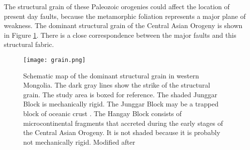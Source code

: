 The structural grain of these Paleozoic orogenies could affect the location of present day faults, because the metamorphic foliation represents a major plane of weakness. The dominant structural grain of the Central Asian Orogeny is shown in Figure \ref{grain}. There is a close correspondence between the major faults and this structural fabric. 

\begin{figure}[h!]
  \centering
  \texttt{[image: grain.png]}
  \caption{Schematic map of the dominant structural grain in western Mongolia. The dark gray lines show the strike of the structural grain. The study area is boxed for reference. The shaded Junggar Block is mechanically rigid. The Junggar Block may be a trapped block of oceanic crust \citep{Carroll1990a}.  The Hangay Block consists of microcontinental fragments that accreted during the early stages of the Central Asian Orogeny. It is not shaded because it is probably not mechanically rigid.  Modified after \citet{Cunningham2005a}}
  \label{grain}
\end{figure}
\clearpage


